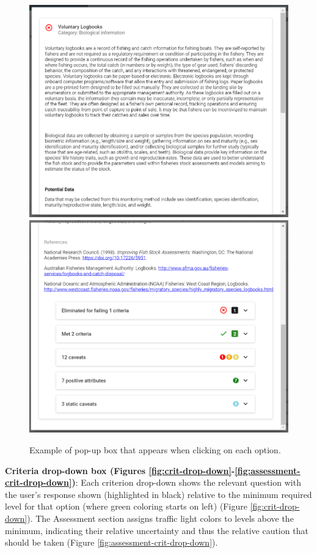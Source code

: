 \documentclass[11pt,]{book}
\begin{document}
\begin{figure}

{\centering \includegraphics[width=0.5\linewidth]{images/option-description} \includegraphics[width=0.5\linewidth]{images/option-result-details} 

}

\caption{Example of pop-up box that appears when clicking on each option.}\label{fig:opt-desc}
\end{figure}

\textbf{Criteria drop-down box (Figures \ref{fig:crit-drop-down}-\ref{fig:assessment-crit-drop-down})}: Each criterion drop-down shows the relevant question with the user's response shown (highlighted in black) relative to the minimum required level for that option (where green coloring starts on left) (Figure \ref{fig:crit-drop-down}). The Assessment section assigns traffic light colors to levels above the minimum, indicating their relative uncertainty and thus the relative caution that should be taken (Figure \ref{fig:assessment-crit-drop-down}).
\end{document}
